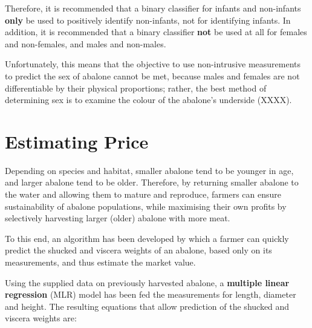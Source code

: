 \documentclass[11pt, a4paper]{article}
\begin{document}
    Therefore, it is recommended that a binary classifier for infants and non-infants \textbf{only} be used to positively identify non-infants, not for identifying infants. In addition, it is recommended that a binary classifier \textbf{not} be used at all for females and non-females, and males and non-males.

    Unfortunately, this means that the objective to use non-intrusive measurements to predict the sex of abalone cannot be met, because males and females are not differentiable by their physical proportions; rather, the best  method of determining sex is to examine the colour of the abalone's underside (XXXX). 

    \section{Estimating Price}

    Depending on species and habitat, smaller abalone tend to be younger in age, and larger abalone tend to be older. Therefore, by returning smaller abalone to the water and allowing them to mature and reproduce, farmers can ensure sustainability of abalone populations, while maximising their own profits by selectively harvesting larger (older) abalone with more meat.

    To this end, an algorithm has been developed by which a farmer can quickly predict the shucked and viscera weights of an abalone, based only on its measurements, and thus estimate the market value.

    Using the supplied data on previously harvested abalone, a \textbf{multiple linear regression} (MLR) model has been fed the measurements for length, diameter and height. The resulting equations that allow prediction of the shucked and viscera weights are:

    
\end{document}
